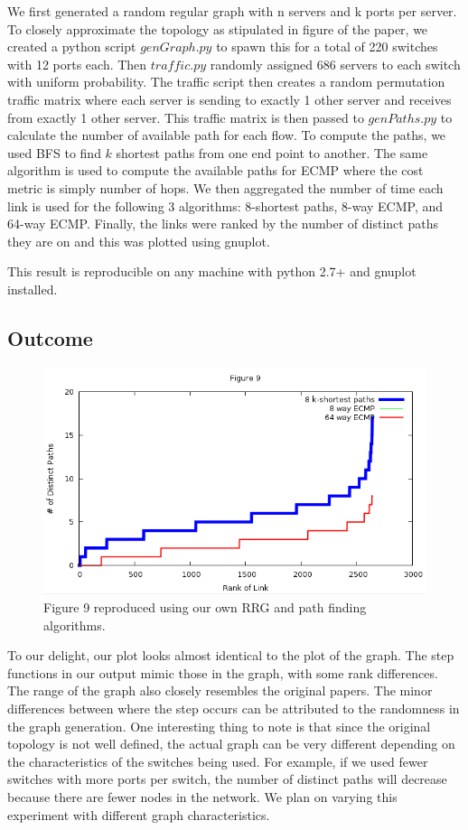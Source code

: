 \documentclass[letter paper, 11pt]{article}
\begin{document}
We first generated a random regular graph with n servers and k ports per server. To closely approximate the topology as stipulated in figure of the paper, we created a python script $genGraph.py$ to spawn this for a total of 220 switches with 12 ports each. Then $traffic.py$ randomly assigned 686 servers to each switch with uniform probability. The traffic script then creates a random permutation traffic matrix where each server is sending to exactly 1 other server and receives from
exactly 1 other server. This traffic matrix is then passed to $genPaths.py$ to calculate the number of available path for each flow. To compute the paths, we used BFS to find $k$ shortest paths from one end point to another. The same algorithm is used to compute the available paths for ECMP where the cost metric is simply number of hops. We then aggregated the number of time each link is used for the following 3 algorithms: 8-shortest paths, 8-way ECMP, and 64-way ECMP.
Finally, the links were ranked by the number of distinct paths they are on and this was plotted using gnuplot.

This result is reproducible on any machine with python 2.7+ and gnuplot installed.
\subsection*{Outcome}


\begin{figure}
    \centering
    \includegraphics[scale=0.5]{outcome}
    \caption*{Figure 9 reproduced using our own RRG and path finding algorithms.}
\end{figure}
To our delight, our plot looks almost identical to the plot of the graph. The step functions in our output mimic those in the graph, with some rank differences. The range of the graph also closely resembles the original papers. The minor differences between where the step occurs can be attributed to the randomness in the graph generation. One interesting thing to note is that since the original topology is not well defined, the actual graph can be very different depending on the
characteristics of the switches being used. For example, if we used fewer switches with more ports per switch, the number of distinct paths will decrease because there are fewer nodes in the network. We plan on varying this experiment with different graph characteristics.
\end{document}
